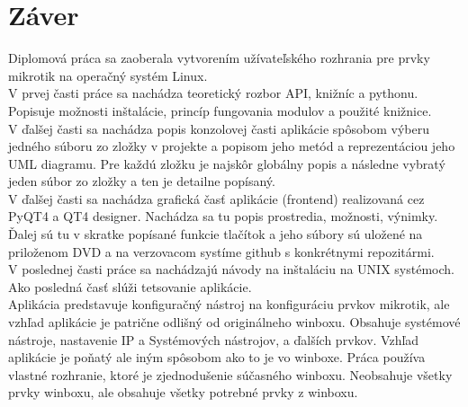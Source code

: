 \chapter{Záver}
Diplomová práca sa zaoberala vytvorením užívateľského rozhrania pre prvky mikrotik na operačný systém Linux. \\
V prvej časti práce sa nachádza teoretický rozbor API, knižníc a pythonu. Popisuje možnosti inštalácie, princíp fungovania modulov a použité knižnice.\\
V ďalšej časti sa nachádza popis konzolovej časti aplikácie spôsobom výberu jedného súboru zo zložky v projekte a popisom jeho metód  a reprezentáciou jeho UML diagramu. Pre každú zložku je najskôr globálny popis a následne vybratý jeden súbor zo zložky a ten je detailne popísaný.\\
V ďalšej časti  sa nachádza grafická časť aplikácie (frontend) realizovaná cez PyQT4 a QT4 designer. Nachádza sa tu popis prostredia, možnosti, výnimky. Ďalej sú tu v skratke popísané funkcie tlačítok a jeho súbory sú uložené na priloženom DVD a na verzovacom systíme github s konkrétnymi repozitármi.\\
V poslednej časti  práce sa nachádzajú návody na inštaláciu na UNIX systémoch. Ako posledná časť slúži tetsovanie aplikácie. \\
Aplikácia predstavuje konfiguračný nástroj na konfiguráciu prvkov mikrotik, ale vzhľad aplikácie je patrične odlišný od originálneho winboxu. Obsahuje systémové nástroje, nastavenie IP a Systémových nástrojov, a ďalších prvkov. Vzhľad aplikácie je poňatý ale iným spôsobom ako to je vo winboxe. Práca používa vlastné rozhranie, ktoré je zjednodušenie súčasného winboxu. Neobsahuje všetky prvky winboxu, ale obsahuje všetky potrebné prvky z winboxu. 